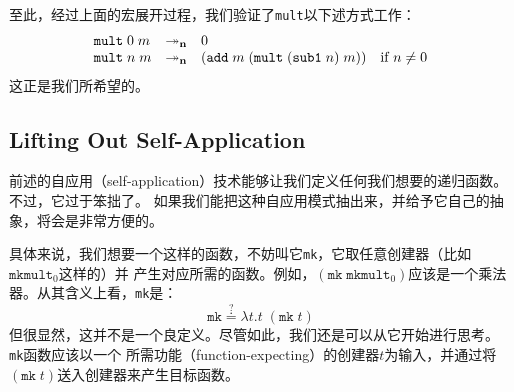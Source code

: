\documentclass[12pt]{article}
\begin{document}
\indent{}至此，经过上面的宏展开过程，我们验证了\texttt{mult}以下述方式工作：
\begin{gather*}
\begin{array}{lll}
\texttt{mult}\;0\;m & \twoheadrightarrow_{\bf{n}} & 0\\
\texttt{mult}\;n\;m & \twoheadrightarrow_{\bf{n}} &
(\texttt{add}\;m\;(\texttt{mult}\;(\texttt{sub1}\;n)\;m))\quad \textrm{if }n\neq{}0
\end{array}
\end{gather*}
\noindent{}这正是我们所希望的。

\subsection{Lifting Out Self-Application}
\indent{}前述的自应用（self-application）技术能够让我们定义任何我们想要的递归函数。不过，它过于笨拙了。
如果我们能把这种自应用模式抽出来，并给予它自己的抽象，将会是非常方便的。

\indent{}具体来说，我们想要一个这样的函数，不妨叫它\texttt{mk}，它取任意创建器（比如$\texttt{mkmult}_0$这样的）并
产生对应所需的函数。例如，$(\texttt{mk}\;\texttt{mkmult}_0)$应该是一个乘法器。从其含义上看，\texttt{mk}是：
\vspace{-0.5em}
\begin{displaymath}
\texttt{mk} \overset{?}{\doteq} \lambda{}t.t\;(\texttt{mk}\;t)
\end{displaymath}
\noindent{}但很显然，这并不是一个良定义。尽管如此，我们还是可以从它开始进行思考。\texttt{mk}函数应该以一个
所需功能（function-expecting）的创建器$t$为输入，并通过将$(\texttt{mk}\;t)$送入创建器来产生目标函数。
\end{document}
